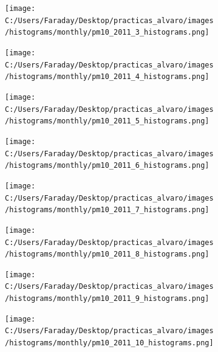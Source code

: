 \documentclass[12pt]{article}
\begin{document}
\begin{figure}[H]
\centering
\begin{subfigure}[h]{0.45\textwidth}
\texttt{[image: C:/Users/Faraday/Desktop/practicas\_alvaro/images/histograms/monthly/pm10\_2011\_3\_histograms.png]}
\caption{}
\label{fig:hist-mon-3-3-2011}
\end{subfigure}
%
\begin{subfigure}[H]{0.45\textwidth}
\texttt{[image: C:/Users/Faraday/Desktop/practicas\_alvaro/images/histograms/monthly/pm10\_2011\_4\_histograms.png]}
\caption{}
\label{fig:hist-mon-3-4-2011}
\end{subfigure}
\caption{}
\end{figure}

\begin{figure}[H]
\centering
\begin{subfigure}[h]{0.45\textwidth}
\texttt{[image: C:/Users/Faraday/Desktop/practicas\_alvaro/images/histograms/monthly/pm10\_2011\_5\_histograms.png]}
\caption{}
\label{fig:hist-mon-3-5-2011}
\end{subfigure}
%
\begin{subfigure}[H]{0.45\textwidth}
\texttt{[image: C:/Users/Faraday/Desktop/practicas\_alvaro/images/histograms/monthly/pm10\_2011\_6\_histograms.png]}
\caption{}
\label{fig:hist-mon-3-6-2011}
\end{subfigure}
\caption{}
\end{figure}

\newpage

\begin{figure}[H]
\centering
\begin{subfigure}[h]{0.45\textwidth}
\texttt{[image: C:/Users/Faraday/Desktop/practicas\_alvaro/images/histograms/monthly/pm10\_2011\_7\_histograms.png]}
\caption{}
\label{fig:hist-mon-3-7-2011}
\end{subfigure}
%
\begin{subfigure}[H]{0.45\textwidth}
\texttt{[image: C:/Users/Faraday/Desktop/practicas\_alvaro/images/histograms/monthly/pm10\_2011\_8\_histograms.png]}
\caption{}
\label{fig:hist-mon-3-8-2011}
\end{subfigure}
\caption{}
\end{figure}

\begin{figure}[H]
\centering
\begin{subfigure}[h]{0.45\textwidth}
\texttt{[image: C:/Users/Faraday/Desktop/practicas\_alvaro/images/histograms/monthly/pm10\_2011\_9\_histograms.png]}
\caption{}
\label{fig:hist-mon-3-9-2011}
\end{subfigure}
%
\begin{subfigure}[H]{0.45\textwidth}
\texttt{[image: C:/Users/Faraday/Desktop/practicas\_alvaro/images/histograms/monthly/pm10\_2011\_10\_histograms.png]}
\caption{}
\label{fig:hist-mon-3-10-2011}
\end{subfigure}
\caption{}
\end{figure}
\end{document}
